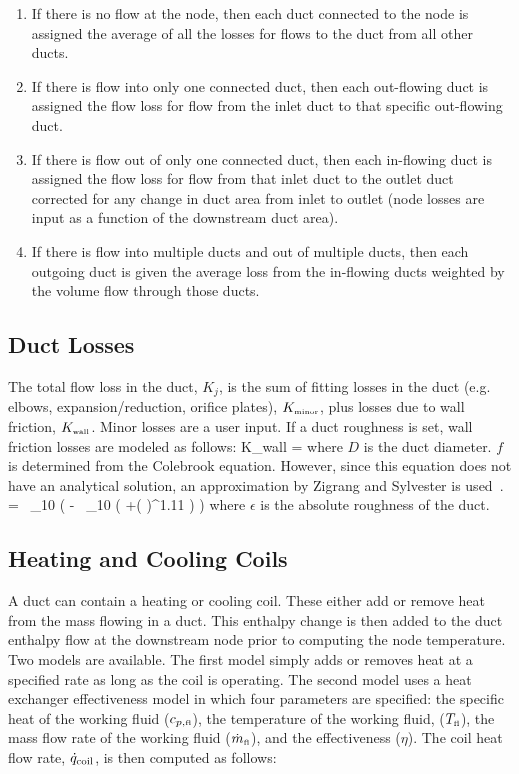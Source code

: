 \begin{enumerate}
\item If there is no flow at the node, then each duct connected to the node is assigned the average of all the losses for flows to the duct from all other ducts.
\item If there is flow into only one connected duct, then each out-flowing duct is assigned the flow loss for flow from the inlet duct to that specific out-flowing duct.
\item If there is flow out of only one connected duct, then each in-flowing duct is assigned the flow loss for flow from that inlet duct to the outlet duct corrected for any change in duct area from inlet to outlet (node losses are input as a function of the downstream duct area).
\item If there is flow into multiple ducts and out of multiple ducts, then each outgoing duct is given the average loss from the in-flowing ducts weighted by the volume flow through those ducts.
\end{enumerate}

\subsection{Duct Losses}

The total flow loss in the duct, $K_j$, is the sum of fitting losses in the duct (e.g. elbows, expansion/reduction, orifice plates), $K_{\mbox{\tiny minor}}$, plus losses due to wall friction, $K_{\mbox{\tiny wall}}$.  Minor losses are a user input. If a duct roughness is set, wall friction losses are modeled as follows:
\be 
   K_{\mbox{\tiny wall}} =  
\ee
where $D$ is the duct diameter.  $f$ is determined from the Colebrook equation. However, since this equation does not have an analytical solution, an approximation by Zigrang and Sylvester is used~\cite{Zigrang:1}.
\be 
    \; =  \, \log_{10} \left(\; - \;  \, \log_{10} \left( +\left(  \right)^{1.11} \right) \right) 
\ee
where $\epsilon$ is the absolute roughness of the duct.

\subsection{Heating and Cooling Coils}

A duct can contain a heating or cooling coil.  These either add or remove heat from the mass flowing in a duct.  This enthalpy change is then added to the duct enthalpy flow at the downstream node prior to computing the node temperature.  Two models are available.  The first model simply adds or removes heat at a specified rate as long as the coil is operating.  The second model uses a heat exchanger effectiveness model in which four parameters are specified: the specific heat of the working fluid ($c_{p,\text{\tiny fl}}$), the temperature of the working fluid, ($T_\text{\tiny fl}$), the mass flow rate of the working fluid ($\dot{m}_\text{\tiny fl}$), and the effectiveness ($\eta$).  The coil heat flow rate, $\dot{q}_{\rm coil}$, is then computed as follows:

